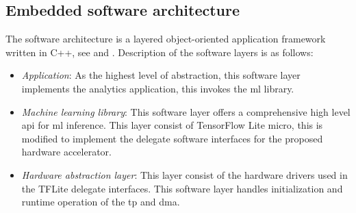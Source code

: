 \subsection{Embedded software architecture}
The software architecture is a layered object-oriented application framework written in C++, see  and . Description of the software layers is as follows:
\begin{itemize}
	\item \emph{Application}: As the highest level of abstraction, this software layer implements the analytics application, this invokes the \gls{ml} library.
	\item \emph{Machine learning library}: This software layer offers a comprehensive high level \gls{api} for \gls{ml} inference. This layer consist of TensorFlow Lite micro, this is modified to implement the delegate software interfaces for the proposed hardware accelerator.
	\item \emph{Hardware abstraction layer}: This layer consist of the hardware drivers used in the TFLite delegate interfaces. This software layer handles initialization and runtime operation of the \gls{tp} and \gls{dma}.
\end{itemize}